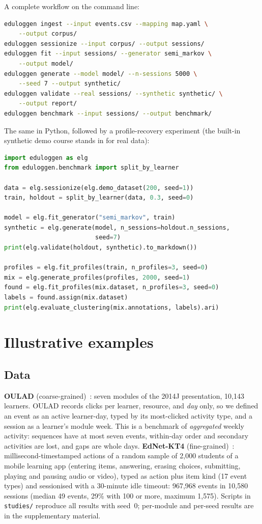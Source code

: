 \documentclass[preprint,12pt]{elsarticle}
\begin{document}
A complete workflow on the command line:
\begin{lstlisting}[language=bash]
eduloggen ingest --input events.csv --mapping map.yaml \
    --output corpus/
eduloggen sessionize --input corpus/ --output sessions/
eduloggen fit --input sessions/ --generator semi_markov \
    --output model/
eduloggen generate --model model/ --n-sessions 5000 \
    --seed 7 --output synthetic/
eduloggen validate --real sessions/ --synthetic synthetic/ \
    --output report/
eduloggen benchmark --input sessions/ --output benchmark/
\end{lstlisting}
The same in Python, followed by a profile-recovery experiment (the built-in
synthetic demo course stands in for real data):
\begin{lstlisting}[language=Python]
import eduloggen as elg
from eduloggen.benchmark import split_by_learner

data = elg.sessionize(elg.demo_dataset(200, seed=1))
train, holdout = split_by_learner(data, 0.3, seed=0)

model = elg.fit_generator("semi_markov", train)
synthetic = elg.generate(model, n_sessions=holdout.n_sessions,
                         seed=7)
print(elg.validate(holdout, synthetic).to_markdown())

profiles = elg.fit_profiles(train, n_profiles=3, seed=0)
mix = elg.generate_profiles(profiles, 2000, seed=1)
found = elg.fit_profiles(mix.dataset, n_profiles=3, seed=0)
labels = found.assign(mix.dataset)
print(elg.evaluate_clustering(mix.annotations, labels).ari)
\end{lstlisting}

\section{Illustrative examples}

\subsection{Data}
\textbf{OULAD} (coarse-grained)~\cite{kuzilek2017oulad}: seven modules of
the 2014J presentation, 10{,}143 learners. OULAD records clicks per learner,
resource, and \emph{day} only, so we defined an event as an active
learner-day, typed by its most-clicked activity type, and a session as a
learner's module week. This is a benchmark of \emph{aggregated} weekly
activity: sequences have at most seven events, within-day order and
secondary activities are lost, and gaps are whole days.
\textbf{EdNet-KT4} (fine-grained)~\cite{choi2020ednet}: millisecond-timestamped
actions of a random sample of 2{,}000 students of a mobile learning app
(entering items, answering, erasing choices, submitting, playing and pausing
audio or video), typed as action plus item kind (17 event types) and
sessionised with a 30-minute idle timeout: 967{,}968 events in 10{,}580
sessions (median 49 events, 29\% with 100 or more, maximum 1{,}575). Scripts in \texttt{studies/} reproduce all results with
seed~0; per-module and per-seed results are in the supplementary material.
\end{document}
